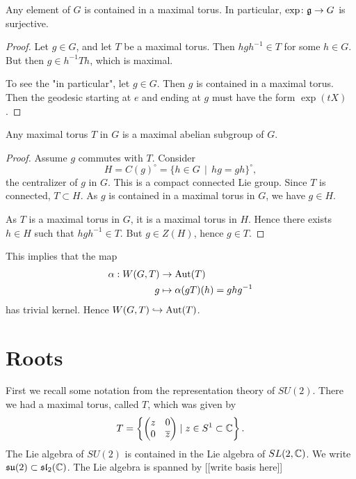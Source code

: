 \documentclass[11pt, english]{article}
\begin{document}
\begin{corr}
Any element of $G$ is contained in a maximal torus. In particular, $\exp \colon \mathfrak g  \to G$ is surjective.
\end{corr}

\begin{proof}
Let $g \in G$, and let $T$ be a maximal torus. Then $hgh^{-1} \in T$ for some $h \in G$. But then $g \in h^{-1}T h$, which is maximal. 

To see the "in particular", let $g \in G$. Then $g$ is contained in a maximal torus. Then the geodesic starting at $e$ and ending at $g$ must have the form $\exp(tX)$. 
\end{proof}

\begin{corr}
Any maximal torus $T$ in $G$ is a maximal abelian subgroup of $G$.
\end{corr}
\begin{proof}
Assume $g$ commutes with $T$. Consider
$$
H = C(g)^\circ = \{ h \in G \, \mid \, hg = gh \}^\circ,
$$
the centralizer of $g$ in $G$. This is a compact connected Lie group. Since $T$ is connected, $T \subset H$. As $g$ is contained in a maximal torus in $G$, we have $g \in H$. 

As $T$ is a maximal torus in $G$, it is a maximal torus in $H$. Hence there exists $h \in H$ such that $hgh^{-1} \in T$. But $g \in Z(H)$, hence $g \in T$.
\end{proof}


\begin{remark}
This implies that the map 
\begin{align*}
\alpha: W(G,T) &\to \operatorname{Aut}(T) \\
g &\mapsto  \alpha(gT)(h) = ghg^{-1}
\end{align*}
has trivial kernel. Hence $W(G,T) \hookrightarrow \operatorname{Aut}(T)$.
\end{remark}




\newpage
\section{Roots}

First we recall some notation from the representation theory of $SU(2)$. There we had a maximal torus, called $T$, which was given by
$$
T = \left\{ \begin{pmatrix} z & 0 \\ 0 & \overline z
\end{pmatrix} \mid z \in S^1 \subset \mathbb{C} \right\}.
$$
The Lie algebra of $SU(2)$ is contained in the Lie algebra of $SL(2,\mathbb{C})$. We write $\mathfrak{su}(2) \subset \mathfrak{sl}_2(\mathbb{C})$. The Lie algebra is spanned by [[write basis here]]
\end{document}
